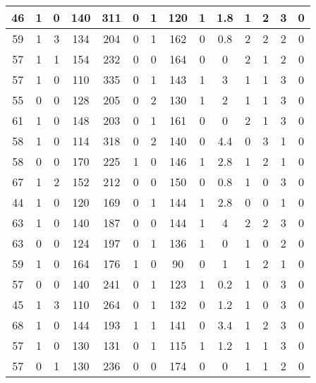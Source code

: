 \documentclass{article}
\begin{document}
\begin{longtable}{|c|c|c|c|c|c|c|c|c|c|c|c|c|c|}
\hline
46 & 1 & 0 & 140 & 311 & 0 & 1 & 120 & 1 & 1.8 & 1 & 2 & 3 & 0\\
\hline
59 & 1 & 3 & 134 & 204 & 0 & 1 & 162 & 0 & 0.8 & 2 & 2 & 2 & 0\\
\hline
57 & 1 & 1 & 154 & 232 & 0 & 0 & 164 & 0 & 0 & 2 & 1 & 2 & 0\\
\hline
57 & 1 & 0 & 110 & 335 & 0 & 1 & 143 & 1 & 3 & 1 & 1 & 3 & 0\\
\hline
55 & 0 & 0 & 128 & 205 & 0 & 2 & 130 & 1 & 2 & 1 & 1 & 3 & 0\\
\hline
61 & 1 & 0 & 148 & 203 & 0 & 1 & 161 & 0 & 0 & 2 & 1 & 3 & 0\\
\hline
58 & 1 & 0 & 114 & 318 & 0 & 2 & 140 & 0 & 4.4 & 0 & 3 & 1 & 0\\
\hline
58 & 0 & 0 & 170 & 225 & 1 & 0 & 146 & 1 & 2.8 & 1 & 2 & 1 & 0\\
\hline
67 & 1 & 2 & 152 & 212 & 0 & 0 & 150 & 0 & 0.8 & 1 & 0 & 3 & 0\\
\hline
44 & 1 & 0 & 120 & 169 & 0 & 1 & 144 & 1 & 2.8 & 0 & 0 & 1 & 0\\
\hline
63 & 1 & 0 & 140 & 187 & 0 & 0 & 144 & 1 & 4 & 2 & 2 & 3 & 0\\
\hline
63 & 0 & 0 & 124 & 197 & 0 & 1 & 136 & 1 & 0 & 1 & 0 & 2 & 0\\
\hline
59 & 1 & 0 & 164 & 176 & 1 & 0 & 90 & 0 & 1 & 1 & 2 & 1 & 0\\
\hline
57 & 0 & 0 & 140 & 241 & 0 & 1 & 123 & 1 & 0.2 & 1 & 0 & 3 & 0\\
\hline
45 & 1 & 3 & 110 & 264 & 0 & 1 & 132 & 0 & 1.2 & 1 & 0 & 3 & 0\\
\hline
68 & 1 & 0 & 144 & 193 & 1 & 1 & 141 & 0 & 3.4 & 1 & 2 & 3 & 0\\
\hline
57 & 1 & 0 & 130 & 131 & 0 & 1 & 115 & 1 & 1.2 & 1 & 1 & 3 & 0\\
\hline
57 & 0 & 1 & 130 & 236 & 0 & 0 & 174 & 0 & 0 & 1 & 1 & 2 & 0\\
\hline
\end{longtable}
\end{document}
